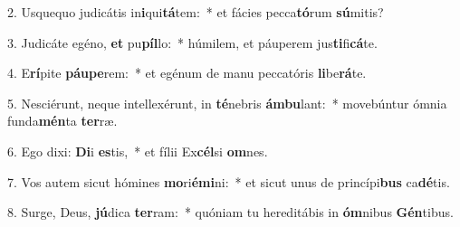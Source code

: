 2. Usquequo judicátis in\textbf{i}qui\textbf{tá}tem:~*  et fácies pecca\textbf{tó}rum \textbf{sú}mitis?\

3. Judicáte egéno, \textbf{et} pu\textbf{píl}lo:~*  húmilem, et páuperem jus\textbf{ti}fi\textbf{cá}te.\

4. E\textbf{rí}pite \textbf{páu}\textbf{pe}rem:~*  et egénum de manu peccatóris \textbf{li}be\textbf{rá}te.\

5. Nesciérunt, neque intellexérunt, in \textbf{té}nebris \textbf{ám}\textbf{bu}lant:~*  movebúntur ómnia funda\textbf{mén}ta \textbf{ter}ræ.\

6. Ego dixi: \textbf{Di}i \textbf{es}tis,~*  et fílii Ex\textbf{cél}si \textbf{om}nes.\

7. Vos autem sicut hómines \textbf{mo}ri\textbf{é}\textbf{mi}ni:~*  et sicut unus de princípi\textbf{bus} ca\textbf{dé}tis.\

8. Surge, Deus, \textbf{jú}dica \textbf{ter}ram:~*  quóniam tu hereditábis in \textbf{óm}nibus \textbf{Gén}tibus.\

